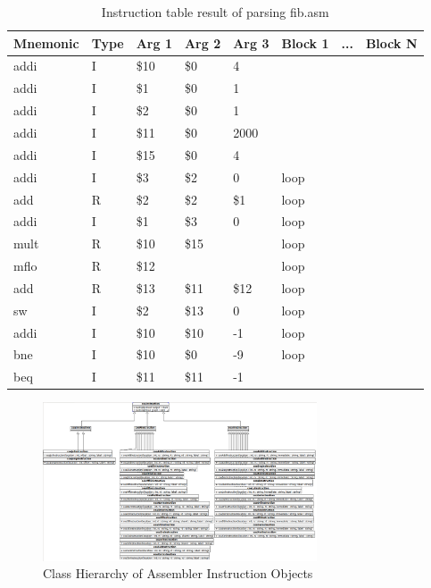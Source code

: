 \documentclass[conference]{IEEEtran}
\begin{document}
\begin{table}[h]
\caption{Instruction table result of parsing fib.asm}
\label{instructTable}
\begin{tabular}{@{}llllllll@{}}
\toprule
Mnemonic & Type & Arg 1 & Arg 2 & Arg 3 & Block 1 & ... & Block N \\ \midrule
addi     & I    & \$10  & \$0   & 4     &         &     &         \\
addi     & I    & \$1   & \$0   & 1     &         &     &         \\
addi     & I    & \$2   & \$0   & 1     &         &     &         \\
addi     & I    & \$11  & \$0   & 2000  &         &     &         \\
addi     & I    & \$15  & \$0   & 4     &         &     &         \\
addi     & I    & \$3   & \$2   & 0     & loop    &     &         \\
add      & R    & \$2   & \$2   & \$1   & loop    &     &         \\
addi     & I    & \$1   & \$3   & 0     & loop    &     &         \\
mult     & R    & \$10  & \$15  &       & loop    &     &         \\
mflo     & R    & \$12  &       &       & loop    &     &         \\
add      & R    & \$13  & \$11  & \$12  & loop    &     &         \\
sw       & I    & \$2   & \$13  & 0     & loop    &     &         \\
addi     & I    & \$10  & \$10  & -1    & loop    &     &         \\
bne      & I    & \$10  & \$0   & -9    & loop    &     &         \\
beq      & I    & \$11  & \$11  & -1    &         &     &         \\ \bottomrule
\end{tabular}
\end{table}

\begin{figure}[!h]
\centering
\includegraphics[width=3.2in]{Figures/coaAssemblerUML}
\caption{Class Hierarchy of Assembler Instruction Objects}
\label{classDiagram}
\end{figure}
\end{document}
